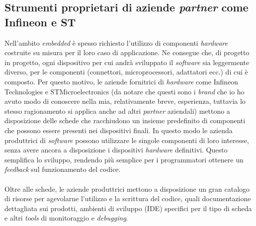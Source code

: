\subsection{Strumenti proprietari di aziende \textit{partner} come Infineon e ST}
\noindent
Nell'ambito \textit{embedded} è spesso richiesto l'utilizzo di componenti \textit{hardware} costruite su misura per il loro caso di applicazione.
Ne consegue che, di progetto in progetto, ogni dispositivo per cui andrà sviluppato il \textit{software} sia leggermente diverso, per le componenti (connettori, microprocessori, adattatori ecc.) di cui è composto.
Per questo motivo, le aziende fornitrici di \textit{hardware} come Infineon Technologies e STMicroelectronics (da notare che questi sono i \textit{brand} che io ho avuto modo di conoscere nella mia, relativamente breve, esperienza, tuttavia lo stesso ragionamento si applica anche ad altri \textit{partner} aziendali) mettono a disposizione delle schede che racchiudono un insieme predefinito di componenti che possono essere presenti nei dispositivi finali.
In questo modo le azienda produttrici di \textit{software} possono utilizzare le singole componenti di loro interesse, senza avere ancora a disposizione i dispositivi \textit{hardware} definitivi.
Questo semplifica lo sviluppo, rendendo più semplice per i programmatori ottenere un \textit{feedback} sul funzionamento del codice.\\\\
\noindent
Oltre alle schede, le aziende produttrici mettono a disposizione un gran catalogo di risorse per agevolarne l'utilizzo e la scrittura del codice, quali documentazione dettagliata sui prodotti, ambienti di sviluppo (\gls{IDE}) specifici per il tipo di scheda e altri \textit{tools} di monitoraggio e \textit{debugging}.



